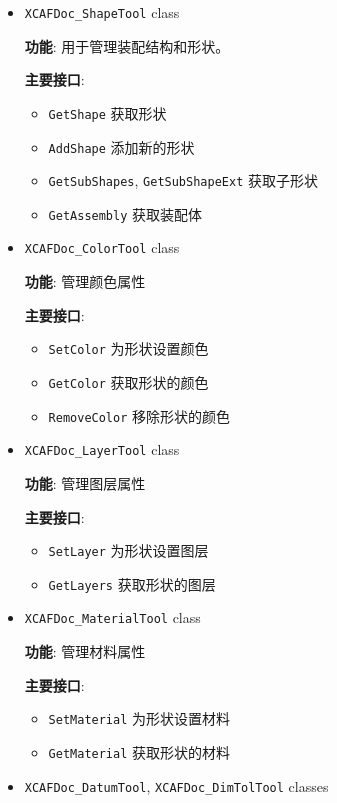 \documentclass[11pt]{article}
\begin{document}
\begin{itemize}
\item \texttt{XCAFDoc\_ShapeTool} class

\textbf{功能}: 用于管理装配结构和形状。

\textbf{主要接口}:

\begin{itemize}
\item \texttt{GetShape} 获取形状
\item \texttt{AddShape} 添加新的形状
\item \texttt{GetSubShapes}, \texttt{GetSubShapeExt} 获取子形状
\item \texttt{GetAssembly} 获取装配体
\end{itemize}

\item \texttt{XCAFDoc\_ColorTool} class

\textbf{功能}: 管理颜色属性

\textbf{主要接口}:

\begin{itemize}
\item \texttt{SetColor} 为形状设置颜色
\item \texttt{GetColor} 获取形状的颜色
\item \texttt{RemoveColor} 移除形状的颜色
\end{itemize}

\item \texttt{XCAFDoc\_LayerTool} class

\textbf{功能}: 管理图层属性

\textbf{主要接口}:

\begin{itemize}
\item \texttt{SetLayer} 为形状设置图层
\item \texttt{GetLayers} 获取形状的图层
\end{itemize}

\item \texttt{XCAFDoc\_MaterialTool} class

\textbf{功能}: 管理材料属性

\textbf{主要接口}:

\begin{itemize}
\item \texttt{SetMaterial} 为形状设置材料
\item \texttt{GetMaterial} 获取形状的材料
\end{itemize}

\item \texttt{XCAFDoc\_DatumTool}, \texttt{XCAFDoc\_DimTolTool} classes


\end{itemize}
\end{document}
